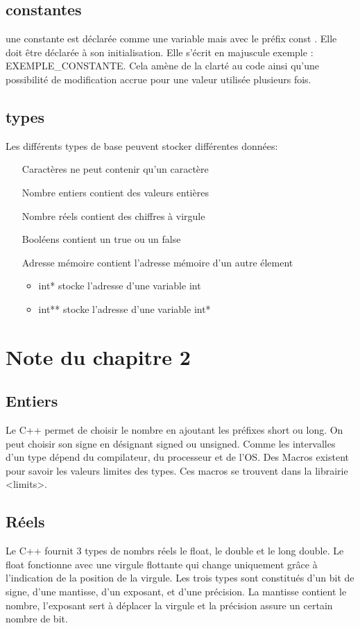 \documentclass{article}
\begin{document}
\subsection{constantes}
une constante est déclarée comme une variable mais avec le préfix \og const \fg. Elle doit être déclarée à son initialisation. Elle s'écrit en majuscule exemple : EXEMPLE\_CONSTANTE. Cela amène de la clarté au code ainsi qu'une possibilité de modification accrue pour une valeur utilisée plusieurs fois.

\subsection{types}
Les différents types de base peuvent stocker différentes données:
\bigskip
\begin{itemize}
    \item [Caractères] ne peut contenir qu'un caractère
    \item [Nombre entiers] contient des valeurs entières
    \item [Nombre réels] contient des chiffres à virgule 
    \item [Booléens] contient un \og true \fg ou un \og false\fg
    \item [Adresse mémoire] contient l'adresse mémoire d'un autre élement
        \begin{itemize}
            \item int* stocke l'adresse d'une variable int 
            \item int** stocke l'adresse d'une variable int*
        \end{itemize}
\end{itemize}
\bigskip

\section{Note du chapitre 2}
\subsection{Entiers}
Le C++ permet de choisir le nombre en ajoutant les préfixes short ou long. On peut choisir son signe en désignant signed ou unsigned. Comme les intervalles d'un type dépend du compilateur, du processeur et de l'OS. Des Macros existent pour savoir les valeurs limites des types. Ces macros se trouvent dans la librairie <limits>.

\subsection{Réels}
Le C++ fournit 3 types de nombrs réels le float, le double et le long double. Le float fonctionne avec une virgule flottante qui change uniquement grâce à l'indication de la position de la virgule. Les trois types sont constitués d'un bit de signe, d'une mantisse, d'un exposant, et d'une précision. La mantisse contient le nombre, l'exposant sert à déplacer la virgule et la précision assure un certain nombre de bit. 
\end{document}
